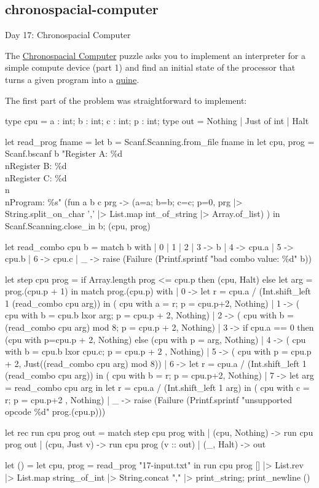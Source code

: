 \documentclass{article}
\begin{document}
\subsection{chronospacial-computer}{Day 17: Chronospacial Computer}

The \href{https://adventofcode.com/2024/day/17}{Chronospacial Computer} puzzle asks you to implement an interpreter for a simple compute device (part 1)
and find an initial state of the processor that turns a given program into a \href{https://en.wikipedia.org/wiki/Quine_(computing)}{quine}.

The first part of the problem was straightforward to implement:
\begin{code}[ocaml]
type cpu = { a : int; b : int; c : int; p : int; }
type out = Nothing | Just of int | Halt

let read_prog fname =
  let b = Scanf.Scanning.from_file fname in
  let cpu, prog =
    Scanf.bscanf b "Register A: \%d\\nRegister B: \%d\\nRegister C: \%d\\n\\nProgram: \%s"
      (fun a b c prg ->
        ({a=a; b=b; c=c; p=0},
         prg |> String.split_on_char ','
         |> List.map int_of_string |> Array.of_list)
      ) in
  Scanf.Scanning.close_in b;
  (cpu, prog)

let read_combo cpu b = match b with
  | 0 | 1 | 2 | 3 -> b
  | 4 -> cpu.a
  | 5 -> cpu.b
  | 6 -> cpu.c
  | _ -> raise (Failure (Printf.sprintf "bad combo value: \%d" b))

let step cpu prog =
  if Array.length prog <= cpu.p then (cpu, Halt) else
    let arg = prog.(cpu.p + 1) in
    match prog.(cpu.p) with
    | 0 -> let r = cpu.a / (Int.shift_left 1 (read_combo cpu arg)) in
           ({ cpu with a = r; p = cpu.p+2}, Nothing)
    | 1 -> ({ cpu with b = cpu.b lxor arg; p = cpu.p + 2}, Nothing)
    | 2 -> ({ cpu with b = (read_combo cpu arg) mod 8; p = cpu.p + 2}, Nothing)
    | 3 -> if cpu.a == 0 then ({cpu with p=cpu.p + 2}, Nothing)
           else ({cpu with p = arg}, Nothing)
    | 4 -> ({ cpu with b = cpu.b lxor cpu.c; p = cpu.p + 2 }, Nothing)
    | 5 -> ({ cpu with p = cpu.p + 2}, Just((read_combo cpu arg) mod 8))
    | 6 -> let r = cpu.a / (Int.shift_left 1 (read_combo cpu arg)) in
           ({ cpu with b = r; p = cpu.p+2}, Nothing)
    | 7 -> let arg = read_combo cpu arg in
           let r = cpu.a / (Int.shift_left 1 arg) in
           ({ cpu with c = r; p = cpu.p+2 }, Nothing)
    | _ -> raise (Failure (Printf.sprintf "unsupported opcode \%d" prog.(cpu.p)))

let rec run cpu prog out =
  match step cpu prog with
  | (cpu, Nothing) -> run cpu prog out
  | (cpu, Just v) -> run cpu prog (v :: out)
  | (_, Halt) -> out

let () =
  let cpu, prog = read_prog "17-input.txt" in
  run cpu prog [] |> List.rev |> List.map string_of_int
  |> String.concat "," |> print_string;
  print_newline ()
\end{code}
\end{document}
